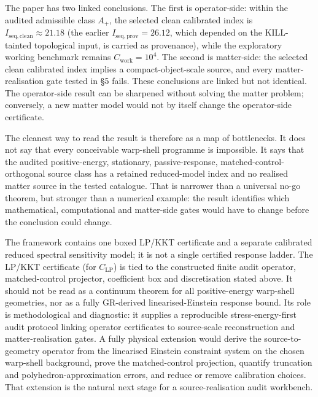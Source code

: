 \documentclass[11pt,a4paper]{article}
\begin{document}
The paper has two linked conclusions. The first is operator-side: within the audited admissible class $A_{+}$, the selected clean calibrated index is $I_{\mathrm{seq,clean}}\approx21.18$ (the earlier $I_{\mathrm{seq,prov}}=26.12$, which depended on the KILL-tainted topological input, is carried as provenance), while the exploratory working benchmark remains $C_{\mathrm{work}}=10^{4}$. The second is matter-side: the selected clean calibrated index implies a compact-object-scale source, and every matter-realisation gate tested in §5 fails. These conclusions are linked but not identical. The operator-side result can be sharpened without solving the matter problem; conversely, a new matter model would not by itself change the operator-side certificate.

The cleanest way to read the result is therefore as a map of bottlenecks. It does not say that every conceivable warp-shell programme is impossible. It says that the audited positive-energy, stationary, passive-response, matched-control-orthogonal source class has a retained reduced-model index and no realised matter source in the tested catalogue. That is narrower than a universal no-go theorem, but stronger than a numerical example: the result identifies which mathematical, computational and matter-side gates would have to change before the conclusion could change.

The framework contains one boxed LP/KKT certificate and a separate calibrated reduced spectral sensitivity model; it is not a single certified response ladder. The LP/KKT certificate (for $C_{\mathrm{LP}}$) is tied to the constructed finite audit operator, matched-control projector, coefficient box and discretisation stated above. It should not be read as a continuum theorem for all positive-energy warp-shell geometries, nor as a fully GR-derived linearised-Einstein response bound. Its role is methodological and diagnostic: it supplies a reproducible stress-energy-first audit protocol linking operator certificates to source-scale reconstruction and matter-realisation gates. A fully physical extension would derive the source-to-geometry operator from the linearised Einstein constraint system on the chosen warp-shell background, prove the matched-control projection, quantify truncation and polyhedron-approximation errors, and reduce or remove calibration choices. That extension is the natural next stage for a source-realisation audit workbench.
\end{document}
